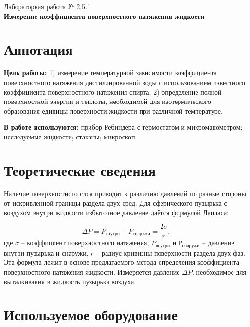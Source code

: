 \documentclass[a4paper,12pt]{article} %
\begin{document}
\begin{center}   
	\large{Лабораторная работа № 2.5.1\\\textbf{Измерение коэффициента поверхностного натяжения жидкости}}\\
\end{center}

\section{Аннотация}

\noindent\textbf{Цель работы:}
1) измерение температурной зависимости  коэффициента поверхностного натяжения дистиллированной воды с использованием известного коэффициента поверхностного натяжения спирта; 2) определение полной поверхностной энергии  и теплоты, необходимой для изотермического образования единицы  поверхности жидкости  при различной температуре.
	
\bigskip
\noindent\textbf{В работе используются:} прибор  Ребиндера  с термостатом и микроманометром; исследуемые жидкости; стаканы; микроскоп.

\section{Теоретические сведения}

Наличие поверхностного слоя приводит к различию давлений по разные стороны от искривленной границы раздела двух сред.  Для сферического пузырька с воздухом  внутри жидкости избыточное давление даётся формулой Лапласа:

\begin{equation}\label{лаплас}
\Delta P = P_{внутри}- P_{снаружи}=\frac{2\sigma}{r}, 
\end{equation}
где $\sigma$ -- коэффициент поверхностного натяжения, $P_{внутри}$ и $Р_{снаружи}$ -- давление внутри пузырька и снаружи, $r$ -- радиус кривизны поверхности раздела двух фаз. Эта формула лежит в основе предлагаемого метода определения коэффициента поверхностного натяжения жидкости. Измеряется давление $\Delta P$, необходимое для выталкивания в жидкость пузырька воздуха.

\newpage

\section{Используемое оборудование}
\end{document}
